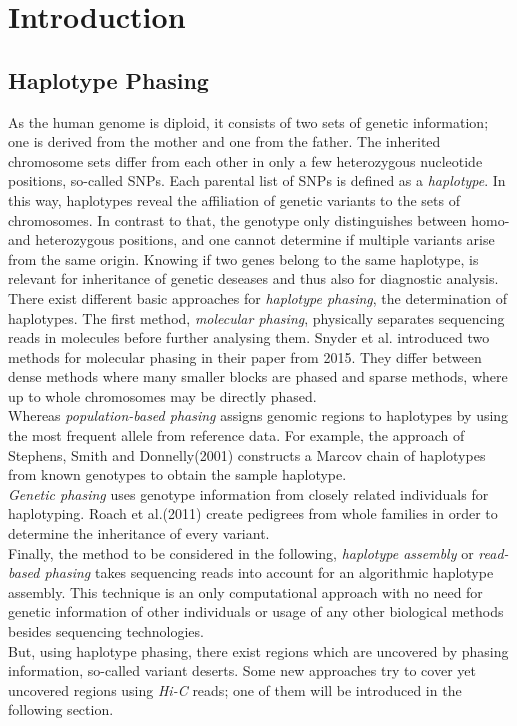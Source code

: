 \pagestyle{headings}
\chapter{Introduction}
\label{chapter:introduction}
\section{Haplotype Phasing}
\label{section:HapPhase}
As the human genome is diploid, it consists of two sets of genetic information; one is derived from the mother and one from the father. The inherited chromosome sets differ from each other in only a few heterozygous nucleotide positions, so-called \acp{SNP}. Each parental list of \acp{SNP} is defined as a \textit{haplotype}. In this way, haplotypes reveal the affiliation of genetic variants to the sets of chromosomes. In contrast to that, the genotype only distinguishes between homo- and heterozygous positions, and one cannot determine if multiple variants arise from the same origin. Knowing if two genes belong to the same haplotype, is relevant for inheritance of genetic deseases and thus also for diagnostic analysis. \cite{Tewhey}\cite{ Glusmann}\\
There exist different basic approaches for \textit{haplotype phasing}, the determination of haplotypes. The first method, \textit{molecular phasing}, physically separates sequencing reads in molecules before further analysing them. Snyder et al. introduced two methods for molecular phasing in their paper from 2015. They differ between dense methods where many smaller blocks are phased and sparse methods, where up to whole chromosomes may be directly phased. \cite{Snyder}\\
Whereas \textit{population-based phasing} assigns genomic regions to haplotypes by using the most frequent allele from reference data. For example, the approach of Stephens, Smith and Donnelly(2001) constructs a Marcov chain of haplotypes from known genotypes to obtain the sample haplotype. \cite{Stephens}\\
\textit{Genetic phasing} uses genotype information from closely related individuals for haplotyping. Roach et al.(2011) create pedigrees from whole families in order to determine the inheritance of every variant. \cite{Roach}\\
Finally, the method to be considered in the following, \textit{haplotype assembly} or \textit{read-based phasing} takes sequencing reads into account for an algorithmic haplotype assembly. This technique is an only computational approach with no need for genetic information of other individuals or usage of any other biological methods besides sequencing technologies. \cite{Glusmann}\\
But, using haplotype phasing, there exist regions which are uncovered by phasing information, so-called variant deserts. Some new approaches try to cover yet uncovered regions using \textit{Hi-C} reads; one of them will be introduced in the following section. 

